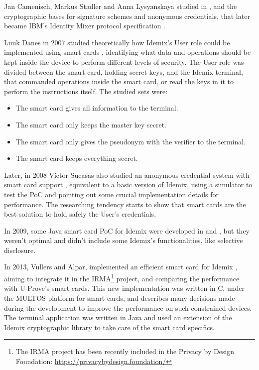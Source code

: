 

\hfil

Jan Camenisch, Markus Stadler and Anna Lysyanskaya studied in \cite{Camenisch:GroupSig}, \cite{Camenisch:AnonCred} and \cite{camenisch2002signature} the cryptographic bases for signature schemes and anonymous credentials, that later became IBM's Identity Mixer protocol specification \cite{idemixSpec}.


Luuk Danes in 2007 studied theoretically how Idemix's User role could be implemented using  
smart cards \cite{luuk}, identifying what data and operations should be kept inside the device to perform different levels of security. The User role was divided between the smart card, holding secret keys, and the Idemix terminal, that commanded operations inside the smart card, or read the keys in it to perform the instructions itself. The studied sets were:
\begin{itemize}
	\item The smart card gives all information to the terminal.
	\item The smart card only keeps the master key secret.
	\item The smart card only gives the pseudonym with the verifier to the terminal.
	\item The smart card keeps everything secret.
\end{itemize}

Later, in 2008 Víctor Sucasas also studied an anonymous credential system with smart card support \cite{sucasas}, equivalent to a basic version of Idemix, using a simulator to test the PoC and pointing out some crucial implementation details for performance. The researching tendency starts to show that smart cards are the best solution to hold safely the User's credentials.

In 2009, some Java smart card PoC for Idemix were developed in \cite{javaIdemix1} and \cite{javaIdemix2}, but they weren't optimal and didn't include some Idemix's functionalities, like selective disclosure.

In 2013, Vullers and Alpar, implemented an efficient smart card for Idemix \cite{vullers2013efficient}, aiming to integrate it in the IRMA\footnote{The IRMA project has been recently included in the Privacy by Design Foundation: \url{https://privacybydesign.foundation/}} project, and comparing the performance with U-Prove's smart cards. This new implementation was written in C, under the MULTOS platform for smart cards, and describes many decisions made during the development to improve the performance on such constrained devices. The terminal application was written in Java and used an extension of the Idemix cryptographic library to take care of the smart card specifics.


